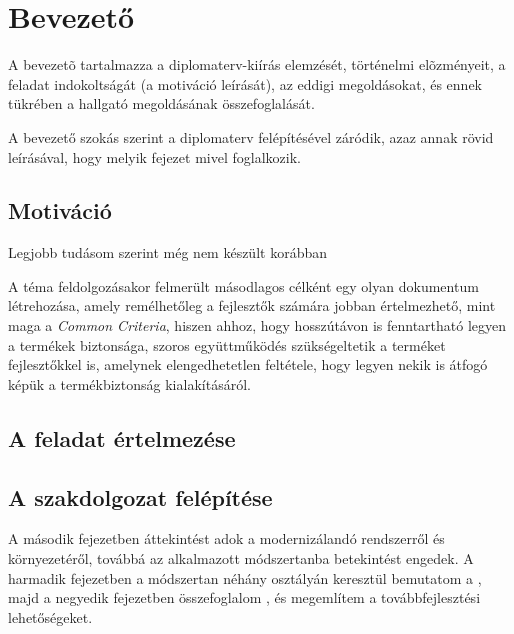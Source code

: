 \chapter{Bevezető}%

A bevezetõ tartalmazza a diplomaterv-kiírás elemzését, történelmi elõzményeit, a feladat
indokoltságát (a motiváció leírását), az eddigi megoldásokat, és ennek tükrében a hallgató
megoldásának összefoglalását.

A bevezető szokás szerint a diplomaterv felépítésével záródik, azaz annak rövid leírásával, hogy
melyik fejezet mivel foglalkozik.

\section{Motiváció}
Legjobb tudásom szerint még nem készült korábban 

A téma feldolgozásakor felmerült másodlagos célként egy olyan dokumentum létrehozása, amely
remélhetőleg a fejlesztők számára jobban értelmezhető, mint maga a \emph{Common Criteria}, hiszen
ahhoz, hogy hosszútávon is fenntartható legyen a termékek biztonsága, szoros együttműködés
szükségeltetik a terméket fejlesztőkkel is, amelynek elengedhetetlen feltétele, hogy legyen nekik is
átfogó képük a termékbiztonság kialakításáról.
\section{A feladat értelmezése}

\section{A szakdolgozat felépítése}
A második fejezetben áttekintést adok a modernizálandó rendszerről és környezetéről, továbbá az
alkalmazott módszertanba betekintést engedek.
A harmadik fejezetben a módszertan néhány osztályán keresztül bemutatom a , majd a negyedik
fejezetben összefoglalom , és megemlítem a továbbfejlesztési lehetőségeket.
